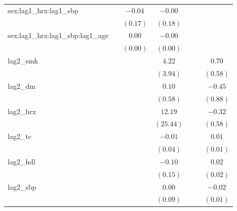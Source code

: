 \begin{tabular}{l c c c c c c}
sex:lag1\_hrx:lag1\_sbp           &              & $-0.04$    & $-0.00$    &                &                &                \\
                                  &              & $(0.17)$   & $(0.18)$   &                &                &                \\
sex:lag1\_hrx:lag1\_sbp:lag1\_age &              & $0.00$     & $-0.00$    &                &                &                \\
                                  &              & $(0.00)$   & $(0.00)$   &                &                &                \\
lag2\_smk                         &              &            & $4.22$     &                &                & $0.70$         \\
                                  &              &            & $(3.94)$   &                &                & $(0.58)$       \\
lag2\_dm                          &              &            & $0.10$     &                &                & $-0.45$        \\
                                  &              &            & $(0.58)$   &                &                & $(0.88)$       \\
lag2\_hrx                         &              &            & $12.19$    &                &                & $-0.32$        \\
                                  &              &            & $(25.44)$  &                &                & $(0.58)$       \\
lag2\_tc                          &              &            & $-0.01$    &                &                & $0.01$         \\
                                  &              &            & $(0.04)$   &                &                & $(0.01)$       \\
lag2\_hdl                         &              &            & $-0.10$    &                &                & $0.02$         \\
                                  &              &            & $(0.15)$   &                &                & $(0.02)$       \\
lag2\_sbp                         &              &            & $0.00$     &                &                & $-0.02$        \\
                                  &              &            & $(0.09)$   &                &                & $(0.01)$       \\

\end{tabular}
